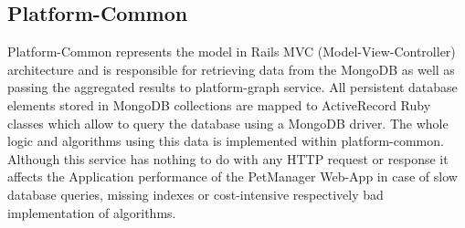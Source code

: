 \subsection{Platform-Common}
Platform-Common represents the model in Rails MVC (Model-View-Controller) architecture and is responsible for retrieving data from the MongoDB as well as passing the aggregated results to platform-graph service. All persistent database elements stored in MongoDB collections are mapped to ActiveRecord Ruby classes which allow to query the database using a MongoDB driver. The whole logic and algorithms using this data is implemented within platform-common. Although this service has nothing to do with any HTTP request or response it affects the Application performance of the PetManager Web-App in case of slow database queries, missing indexes or cost-intensive respectively bad implementation of algorithms.
